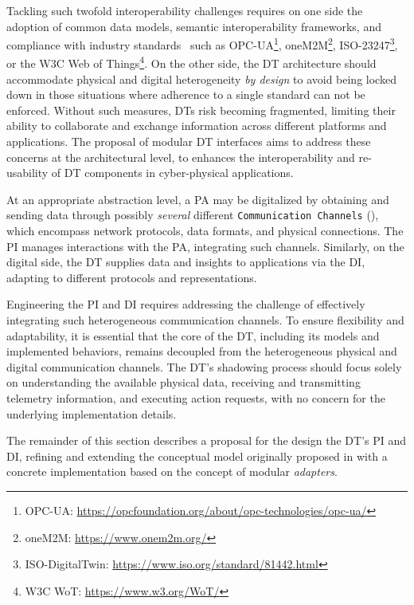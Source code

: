 Tackling such twofold interoperability challenges requires on one side
the adoption of common data models, semantic interoperability frameworks, and compliance with industry standards~\cite{etsi-dt-comm-requirements-2024} such as OPC-UA\footnote{OPC-UA: \url{https://opcfoundation.org/about/opc-technologies/opc-ua/}}, oneM2M\footnote{oneM2M: \url{https://www.onem2m.org/}}, ISO-23247\footnote{ISO-DigitalTwin: \url{https://www.iso.org/standard/81442.html}}, or the W3C Web of Things\footnote{W3C WoT: \url{https://www.w3.org/WoT/}}.
%
On the other side, the \ac{DT} architecture should accommodate physical and digital heterogeneity \emph{by design} to avoid being locked down in those situations where adherence to a single standard can not be enforced.
Without such measures, \acp{DT} risk becoming fragmented, limiting their ability to collaborate and exchange information across different platforms and applications.
%
The proposal of modular \ac{DT} interfaces aims to address these concerns
at the architectural level, to enhances the interoperability and re-usability of \ac{DT} components in cyber-physical applications.

At an appropriate abstraction level, a \ac{PA} may be digitalized by obtaining and sending data through possibly \emph{several} different \texttt{Communication Channels} (), which 
encompass network protocols, data formats, and physical connections.
The \ac{PI} manages interactions with the \ac{PA}, integrating such channels.
%
Similarly, on the digital side, the \ac{DT} supplies data and insights to applications via the \ac{DI}, adapting to different protocols and representations.

Engineering the \ac{PI} and \ac{DI} requires addressing the challenge of effectively integrating such heterogeneous communication channels.
%
To ensure flexibility and adaptability, it is essential that the core of the \ac{DT}, including its models and implemented behaviors, remains decoupled from the heterogeneous physical and digital communication channels.
%
The \ac{DT}'s shadowing process should focus solely on understanding the available physical data, receiving and transmitting telemetry information, and executing action requests, with no concern for the underlying implementation details.

The remainder of this section describes a proposal for the design the \ac{DT}'s \ac{PI} and \ac{DI}, refining and extending the conceptual model originally proposed in \cite{web-of-dt-ricci-2022} with a concrete implementation based on the concept of modular \emph{adapters}.

